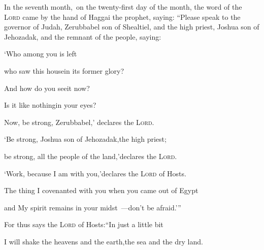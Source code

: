 
\begin{inparaenum}
  \noindent{} In the seventh month,\understood\ on the twenty-first day of the month, the word of the \textsc{Lord} came by the hand of Haggai the prophet, saying:%
   ``Please speak to the governor of Judah, Zerubbabel son of Shealtiel, and the high priest, Joshua son of Jehozadak, and the remnant of the people, saying:\smallskip%
  
  \pc {} `Who among you is left%
  
  \pd who saw this house\pa in its former glory?%
  
  \pd And how do you see\pa it now?%
  
  \pd Is it like nothing\pa in your eyes?%
  
  \pc {} Now, be strong, Zerubbabel,' declares the \textsc{Lord}.%
  
  \pd `Be strong, Joshua son of Jehozadak,\pa the high priest;%
  
  \pd be strong, all the people of the land,'\pa declares the \textsc{Lord}.%
  
  \pd `Work, because I am with you,'\pa declares the \textsc{Lord} of Hosts.%
  
  \pc {}%
  The thing%
  I covenanted with you when you came out of Egypt%
  
  \pd and My spirit remains in your midst~---\pa don't be afraid.'\thinspace''\bigskip%
  
  \pc {} For thus says the \textsc{Lord} of Hosts:\pa ``In just a little bit%
  
  \pd I will shake the heavens and the earth,\pa the sea and the dry land.%
  

\end{inparaenum}
